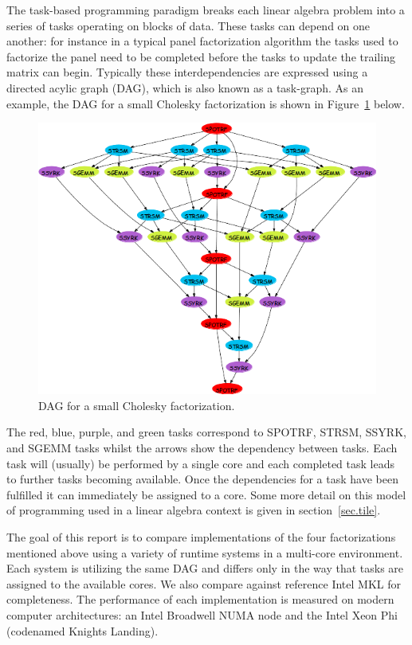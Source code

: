 \documentclass[a4paper,12pt]{article}
\begin{document}
The task-based programming paradigm breaks each linear algebra
problem into a series of tasks operating on blocks of data.
These tasks can depend on one another:
for instance in a typical panel factorization algorithm
the tasks used to factorize the panel need to be completed
before the tasks to update the trailing matrix can begin.
Typically these interdependencies are expressed using a
directed acylic graph (DAG),
which is also known as a task-graph.
As an example,
the DAG for a small Cholesky factorization is shown in
Figure~\ref{fig.chol_dag} below.
\begin{figure}[th]
  \centering
  \includegraphics[scale=.6]{fig/spotrf_dag.png}
  \caption{DAG for a small Cholesky factorization.}
  \label{fig.chol_dag}
\end{figure}

The red, blue, purple, and green tasks correspond to
SPOTRF, STRSM, SSYRK, and SGEMM tasks
whilst the arrows show the dependency between tasks.
Each task will (usually) be performed by a single core
and each completed task leads to further tasks becoming available.
Once the dependencies for a task have been fulfilled it
can immediately be assigned to a core.
Some more detail on this model of programming
used in a linear algebra context is given in section~\ref{sec.tile}.

The goal of this report is to compare implementations of
the four factorizations mentioned above
using a variety of runtime systems in a multi-core environment.
Each system is utilizing the same DAG and differs only in the way
that tasks are assigned to the available cores.
We also compare against reference Intel MKL
for completeness.
The performance of each implementation is measured
on modern computer architectures:
an Intel Broadwell NUMA node
and the Intel Xeon Phi (codenamed Knights Landing).
\end{document}
